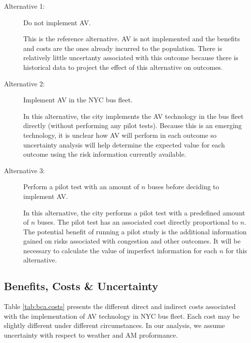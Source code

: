 \documentclass[11pt, letterpaper]{article}
\begin{document}
\begin{description}%
\item[Alternative 1:] Do not implement AV.

This is the reference alternative. AV is not implemented and the
benefits and costs are the ones already incurred to the population.
There is relatively little uncertanty associated with this outcome
because there is historical data to project the effect of this
alternative on outcomes.

\item[Alternative 2:] Implement AV in the NYC bus fleet.

In this alternative, the city implements the AV technology in the bus
fleet directly (without performing any pilot tests).  Because this is
an emerging technology, it is unclear how AV will perform in each
outcome so uncertainty analysis will help determine the expected value
for each outcome using the risk information currently available.

\item[Alternative 3:] Perform a pilot test with an amount of $n$ buses
  before deciding to implement AV.

In this alternative, the city performs a pilot test with a predefined
amount of $n$ buses. The pilot test has an associated cost directly
proportional to $n$.  The potential benefit of running a pilot study
is the additional information gained on risks associated with
congestion and other outcomes.  It will be necessary to calculate the
value of imperfect information for each $n$ for this alternative.


\end{description}

\subsection{Benefits, Costs \& Uncertainty}

Table \ref{tab:bca.costs} presents the different direct and indirect
costs associated with the implementation of AV technology in NYC bus
fleet.  Each cost may be slightly different under different
circumstances.  In our analysis, we assume uncertainty with respect to
weather and AM proformance.
\end{document}
